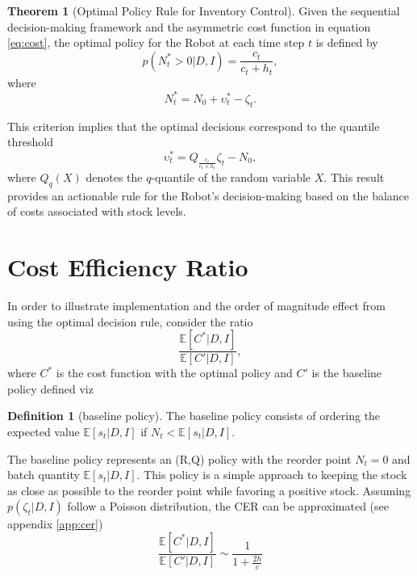 \documentclass[a4paper,12pt]{article}
\theoremstyle{definition}
\newtheorem{theorem}{Theorem}
\newtheorem{definition}{Definition}
\begin{document}
	\begin{theorem}[Optimal Policy Rule for Inventory Control]
		Given the sequential decision-making framework and the asymmetric cost function in equation \eqref{eq:cost}, the optimal policy for the Robot at each time step $t$ is defined by
		\begin{equation}
			p(N_t^* > 0 | D, I) = \frac{c_t}{c_t + h_t},
		\end{equation}
		where
		\begin{equation}
			N_t^* = N_0 +\upsilon_t^*-\zeta_t.
		\end{equation}
	\end{theorem}
	
	This criterion implies that the optimal decisions correspond to the quantile threshold
	\begin{equation}
		\upsilon_t^* = Q_{\frac{c_t}{c_t+h_t}}\zeta_t-N_0,
		\label{eq:opt}
	\end{equation}
	where $Q_q(X)$ denotes the $q$-quantile of the random variable $X$. This result provides an actionable rule for the Robot’s decision-making based on the balance of costs associated with stock levels.
	
	\section{Cost Efficiency Ratio}
	In order to illustrate implementation and the order of magnitude effect from using the optimal decision rule, consider the ratio
	\begin{equation}
		\frac{\mathbb{E}[C^*|D,I]}{\mathbb{E}[C'|D,I]},
	\end{equation}
	where $C^*$ is the cost function with the optimal policy and $C'$ is the baseline policy defined viz
	
	\begin{definition}[baseline policy]
		The baseline policy consists of ordering the expected value $\mathbb{E}[s_t|D,I]$ if $N_t<\mathbb{E}[s_t|D,I]$.
	\end{definition}
	
	The baseline policy represents an (R,Q) policy with the reorder point $N_t=0$ and batch quantity $\mathbb{E}[s_t|D,I]$. This policy is a simple approach to keeping the stock as close as possible to the reorder point while favoring a positive stock. Assuming $p(\zeta_t|D,I)$ follow a Poisson distribution, the CER can be approximated (see appendix \ref{app:cer})
	\begin{equation}
		\frac{\mathbb{E}[C^*|D,I] }{\mathbb{E}[C'|D,I]}\sim \frac{1}{1+\frac{2h}{c}}
	\end{equation}
	
\end{document}
